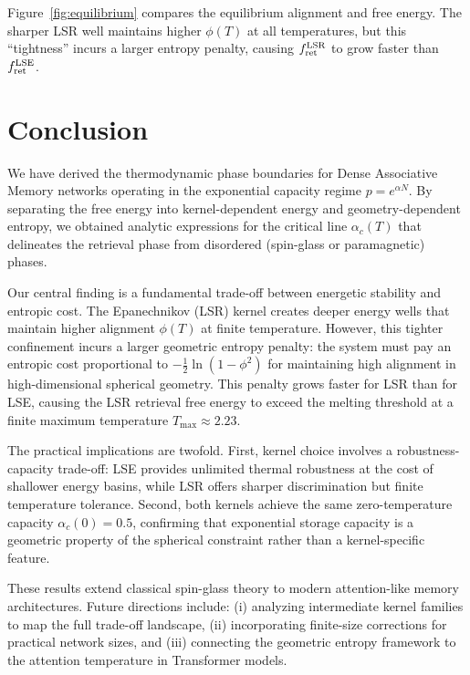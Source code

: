 \documentclass{article}
\theoremstyle{plain}
\theoremstyle{definition}
\theoremstyle{remark}
\begin{document}
Figure~\ref{fig:equilibrium} compares the equilibrium alignment and free energy. The sharper LSR well maintains higher $\phi(T)$ at all temperatures, but this ``tightness'' incurs a larger entropy penalty, causing $f_{\rm ret}^{\rm LSR}$ to grow faster than $f_{\rm ret}^{\rm LSE}$.



\section{Conclusion}

We have derived the thermodynamic phase boundaries for Dense Associative Memory networks operating in the exponential capacity regime $p = e^{\alpha N}$. By separating the free energy into kernel-dependent energy and geometry-dependent entropy, we obtained analytic expressions for the critical line $\alpha_c(T)$ that delineates the retrieval phase from disordered (spin-glass or paramagnetic) phases.

Our central finding is a fundamental trade-off between energetic stability and entropic cost. The Epanechnikov (LSR) kernel creates deeper energy wells that maintain higher alignment $\phi(T)$ at finite temperature. However, this tighter confinement incurs a larger geometric entropy penalty: the system must pay an entropic cost proportional to $-\frac{1}{2}\ln(1-\phi^2)$ for maintaining high alignment in high-dimensional spherical geometry. This penalty grows faster for LSR than for LSE, causing the LSR retrieval free energy to exceed the melting threshold at a finite maximum temperature $T_{\max} \approx 2.23$.

The practical implications are twofold. First, kernel choice involves a robustness-capacity trade-off: LSE provides unlimited thermal robustness at the cost of shallower energy basins, while LSR offers sharper discrimination but finite temperature tolerance. Second, both kernels achieve the same zero-temperature capacity $\alpha_c(0) = 0.5$, confirming that exponential storage capacity is a geometric property of the spherical constraint rather than a kernel-specific feature.

These results extend classical spin-glass theory to modern attention-like memory architectures. Future directions include: (i) analyzing intermediate kernel families to map the full trade-off landscape, (ii) incorporating finite-size corrections for practical network sizes, and (iii) connecting the geometric entropy framework to the attention temperature in Transformer models.
\end{document}
